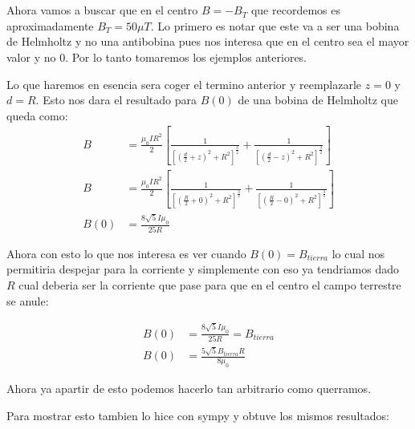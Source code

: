 \documentclass{report}
\begin{document}
\section{}

Ahora vamos a buscar que en el centro $ B = - B_T$ que recordemos es aproximadamente $B_T = 50 \mu T$. Lo primero es notar que este va a ser una bobina de Helmholtz y no una antibobina pues nos interesa que en el centro sea el mayor valor y no $0$. Por lo tanto tomaremos los ejemplos anteriores.

Lo que haremos en esencia sera coger el termino anterior y reemplazarle $z = 0$ y $d = R$. Esto nos dara el resultado para $B(0)$ de una bobina de Helmholtz que queda como:
\begin{align*}
	B & = \frac{\mu_0 I R^2}{2} \left[\frac{1}{\left[ \left(\frac{d}{2} + z\right)^2 + R^2\right]^{\frac{3}{2}}} + \frac{1}{\left[ \left(\frac{d}{2} - z\right)^2 + R^2\right]^{\frac{3}{2}}}\right]\\
	B & = \frac{\mu_0 I R^2}{2} \left[\frac{1}{\left[ \left(\frac{R}{2} + 0\right)^2 + R^2\right]^{\frac{3}{2}}} + \frac{1}{\left[ \left(\frac{R}{2} - 0\right)^2 + R^2\right]^{\frac{3}{2}}}\right]\\
	B(0) &= \frac{8 \sqrt{5} I \mu_{0}}{25 R}
\end{align*}

Ahora con esto lo que nos interesa es ver cuando $B(0) = B_{tierra}$ lo cual nos permitiria despejar para la corriente y simplemente con eso ya tendriamos dado $R$ cual deberia ser la corriente que pase para que en el centro el campo terrestre se anule:

\begin{align*}
	B(0) &= \frac{8 \sqrt{5} I \mu_{0}}{25 R} = B_{tierra}\\
	B(0) &= \frac{5 \sqrt{5} B_{tierra} R}{8 \mu_{0}}
\end{align*}

Ahora ya apartir de esto podemos hacerlo tan arbitrario como  querramos.

Para mostrar esto tambien lo hice con sympy y obtuve los mismos resultados:

\end{document}
